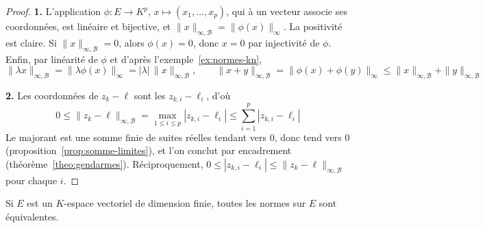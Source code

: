 \begin{proof}
\textbf{1.} L'application $\phi:E\to K^p$, $x\mapsto(x_1,\dots,x_p)$, qui à un vecteur associe ses coordonnées, est linéaire et bijective, et $\|x\|_{\infty,\mathcal{B}}=\|\phi(x)\|_\infty$. La positivité est claire. Si $\|x\|_{\infty,\mathcal{B}}=0$, alors $\phi(x)=0$, donc $x=0$ par injectivité de $\phi$. Enfin, par linéarité de $\phi$ et d'après l'exemple~\ref{ex:normes-kn},
\[\|\lambda x\|_{\infty,\mathcal{B}}=\|\lambda\phi(x)\|_\infty=|\lambda|\,\|x\|_{\infty,\mathcal{B}},\qquad \|x+y\|_{\infty,\mathcal{B}}=\|\phi(x)+\phi(y)\|_\infty\leq\|x\|_{\infty,\mathcal{B}}+\|y\|_{\infty,\mathcal{B}}\]

\textbf{2.} Les coordonnées de $z_k-\ell$ sont les $z_{k,i}-\ell_i$, d'où
\[0\leq\|z_k-\ell\|_{\infty,\mathcal{B}}=\max_{1\leq i\leq p}|z_{k,i}-\ell_i|\leq\sum_{i=1}^{p}|z_{k,i}-\ell_i|\]
Le majorant est une somme finie de suites réelles tendant vers $0$, donc tend vers $0$ (proposition~\ref{prop:somme-limites}), et l'on conclut par encadrement (théorème~\ref{theo:gendarmes}). Réciproquement, $0\leq|z_{k,i}-\ell_i|\leq\|z_k-\ell\|_{\infty,\mathcal{B}}$ pour chaque $i$.
\end{proof}

\begin{theo}
\label{theo:normes-equivalentes-dim-finie}
Si $E$ est un $K$-espace vectoriel de dimension finie, toutes les normes sur $E$ sont équivalentes.
\end{theo}

